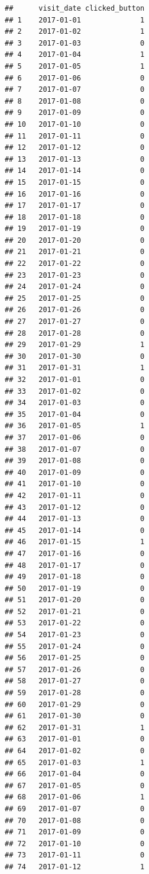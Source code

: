 \documentclass[]{article}
\begin{document}
\begin{verbatim}
##      visit_date clicked_button
## 1    2017-01-01              1
## 2    2017-01-02              1
## 3    2017-01-03              0
## 4    2017-01-04              1
## 5    2017-01-05              1
## 6    2017-01-06              0
## 7    2017-01-07              0
## 8    2017-01-08              0
## 9    2017-01-09              0
## 10   2017-01-10              0
## 11   2017-01-11              0
## 12   2017-01-12              0
## 13   2017-01-13              0
## 14   2017-01-14              0
## 15   2017-01-15              0
## 16   2017-01-16              0
## 17   2017-01-17              0
## 18   2017-01-18              0
## 19   2017-01-19              0
## 20   2017-01-20              0
## 21   2017-01-21              0
## 22   2017-01-22              0
## 23   2017-01-23              0
## 24   2017-01-24              0
## 25   2017-01-25              0
## 26   2017-01-26              0
## 27   2017-01-27              0
## 28   2017-01-28              0
## 29   2017-01-29              1
## 30   2017-01-30              0
## 31   2017-01-31              1
## 32   2017-01-01              0
## 33   2017-01-02              0
## 34   2017-01-03              0
## 35   2017-01-04              0
## 36   2017-01-05              1
## 37   2017-01-06              0
## 38   2017-01-07              0
## 39   2017-01-08              0
## 40   2017-01-09              0
## 41   2017-01-10              0
## 42   2017-01-11              0
## 43   2017-01-12              0
## 44   2017-01-13              0
## 45   2017-01-14              0
## 46   2017-01-15              1
## 47   2017-01-16              0
## 48   2017-01-17              0
## 49   2017-01-18              0
## 50   2017-01-19              0
## 51   2017-01-20              0
## 52   2017-01-21              0
## 53   2017-01-22              0
## 54   2017-01-23              0
## 55   2017-01-24              0
## 56   2017-01-25              0
## 57   2017-01-26              0
## 58   2017-01-27              0
## 59   2017-01-28              0
## 60   2017-01-29              0
## 61   2017-01-30              0
## 62   2017-01-31              1
## 63   2017-01-01              0
## 64   2017-01-02              0
## 65   2017-01-03              1
## 66   2017-01-04              0
## 67   2017-01-05              0
## 68   2017-01-06              1
## 69   2017-01-07              0
## 70   2017-01-08              0
## 71   2017-01-09              0
## 72   2017-01-10              0
## 73   2017-01-11              0
## 74   2017-01-12              1

\end{verbatim}
\end{document}
